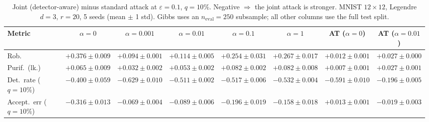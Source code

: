 \begin{table}[htbp]
  \centering
  \begin{tabular}{@{}lccccccc@{}}
    \toprule
    Metric & $\alpha{=}0$ & $\alpha{=}0.001$ & $\alpha{=}0.01$ & $\alpha{=}0.1$ & $\alpha{=}1$ & AT ($\alpha{=}0$) & AT ($\alpha{=}0.01$) \\
    \midrule
    Rob. & $+0.376 \pm 0.009$ & $+0.094 \pm 0.001$ & $+0.114 \pm 0.005$ & $+0.254 \pm 0.031$ & $+0.267 \pm 0.017$ & $+0.012 \pm 0.001$ & $+0.027 \pm 0.000$ \\
    Purif.\ (lk.) & $+0.065 \pm 0.009$ & $+0.032 \pm 0.002$ & $+0.053 \pm 0.002$ & $+0.082 \pm 0.002$ & $+0.082 \pm 0.008$ & $+0.007 \pm 0.001$ & $+0.027 \pm 0.001$ \\
    Det.\ rate ($q{=}10\%$) & $-0.400 \pm 0.059$ & $-0.629 \pm 0.010$ & $-0.511 \pm 0.002$ & $-0.517 \pm 0.006$ & $-0.532 \pm 0.004$ & $-0.591 \pm 0.010$ & $-0.196 \pm 0.005$ \\
    Accept.\ err ($q{=}10\%$) & $-0.316 \pm 0.013$ & $-0.069 \pm 0.004$ & $-0.089 \pm 0.006$ & $-0.196 \pm 0.019$ & $-0.158 \pm 0.018$ & $+0.013 \pm 0.001$ & $-0.019 \pm 0.003$ \\
    \bottomrule
  \end{tabular}
  \caption{Joint (detector-aware) minus standard attack at $\varepsilon=0.1$, $q{=}10\%$. Negative $\Rightarrow$ the joint attack is stronger. MNIST $12\times12$, Legendre $d{=}3$, $r{=}20$, 5 seeds (mean $\pm$ 1 std). Gibbs uses an $n_{\mathrm{eval}}=250$ subsample; all other columns use the full test split.}
  \label{tab:mnist_r12_joint_r20_eps0.1}
\end{table}
